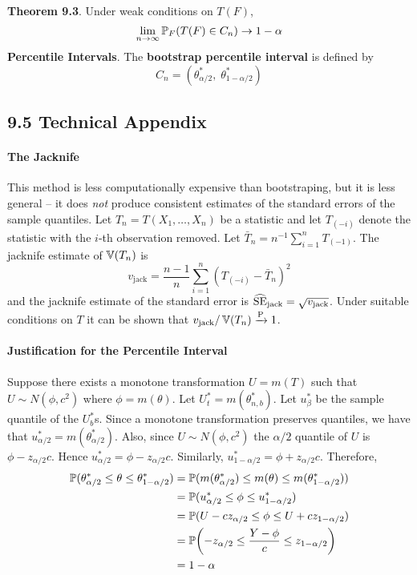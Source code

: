 \textbf{Theorem 9.3}. Under weak conditions on \(T(F)\),
\[
\lim _{n \rightarrow \infty} \PROB_F\left(T(F) \in C_{n}\right) \rightarrow 1 - \alpha
\]
\textbf{Percentile Intervals}.
The \textbf{bootstrap percentile interval} is defined by
\[
C_{n} = \left( \theta_{\alpha/2}^{*}, \; \theta_{1 - \alpha/2}^{*}\right)
\]

\subsection*{9.5 Technical Appendix}
\paragraph{The Jacknife}\label{the-jacknife}
This method is less computationally expensive than bootstraping, but it
is less general -- it does \emph{not} produce consistent estimates of
the standard errors of the sample quantiles.
Let \(T_{n} = T(X_{1}, \dots, X_{n})\) be a statistic and let \(T_{(-i)}\)
denote the statistic with the \(i\)-th observation removed. Let
\(\bar{T}_{n} = n^{-1} \sum_{i=1}^{n} T_{(-1)}\). The jacknife estimate
of \(\operatorname{\mathbb{V}}(T_{n})\) is
\[
v_\text{jack} = \frac{n - 1}{n} \sum_{i=1}^{n} \left(T_{(-i)} - \bar{T}_{n} \right)^{2}
\]
and the jacknife estimate of the standard error is
\(\widehat{\operatorname{\mathrm{SE}}}_\text{jack} = \sqrt{v_\text{jack}}\).
Under suitable conditions on \(T\) it can be shown that
\(v_\text{jack} / \operatorname{\mathbb{V}}(T_{n}) \xrightarrow{\textrm{P}} 1\).
\paragraph{Justification for the Percentile
Interval}\label{justification-for-the-percentile-interval}
Suppose there exists a monotone transformation \(U = m(T)\) such that
\(U \sim N(\phi, c^{2})\) where \(\phi = m(\theta)\).
Let \(U_t^{*} = m(\theta_{n, b}^{*})\). Let \(u_\beta^{*}\) be the sample
quantile of the \(U_b^{*}\)s. Since a monotone transformation preserves
quantiles, we have that \(u_{\alpha/2}^{*} = m(\theta_{\alpha/2}^{*})\).
Also, since \(U \sim N(\phi, c^{2})\) the \(\alpha/2\) quantile of \(U\)
is \(\phi - z_{\alpha/2}c\). Hence
\(u_{\alpha/2}^{*} = \phi - z_{\alpha/2}c\). Similarly,
\(u_{1 - \alpha/2}^{*} = \phi + z_{\alpha/2}c\).
Therefore,
\begin{align*}
\PROB(\theta_{\alpha/2}^{*} \leq \theta \leq \theta_{1 - \alpha/2}^{*}) &=
\PROB(m(\theta_{\alpha/2}^{*}) \leq m(\theta) \leq m(\theta_{1 - \alpha/2}^{*})) \\
&= \PROB(u_{\alpha/2}^{*} \leq \phi \leq u_{1 - \alpha/2}^{*}) \\
&= \PROB(U - cz_{\alpha/2} \leq \phi \leq U + cz_{1 - \alpha/2}) \\
&= \PROB\left(-z_{\alpha/2} \leq \frac{Y - \phi}{c} \leq z_{1 - \alpha/2} \right) \\
&= 1 - \alpha
\end{align*}

